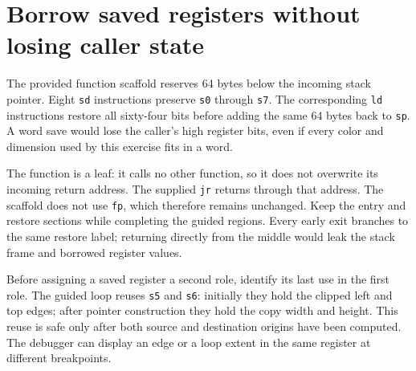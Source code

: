 \section{Borrow saved registers without losing caller state}\label{blit-calling}
The provided function scaffold reserves 64 bytes below the incoming stack pointer. Eight \texttt{sd} instructions preserve \texttt{s0} through \texttt{s7}. The corresponding \texttt{ld} instructions restore all sixty-four bits before adding the same 64 bytes back to \texttt{sp}. A word save would lose the caller's high register bits, even if every color and dimension used by this exercise fits in a word.

The function is a leaf: it calls no other function, so it does not overwrite its incoming return address. The supplied \texttt{jr} returns through that address. The scaffold does not use \texttt{fp}, which therefore remains unchanged. Keep the entry and restore sections while completing the guided regions. Every early exit branches to the same restore label; returning directly from the middle would leak the stack frame and borrowed register values.

Before assigning a saved register a second role, identify its last use in the first role. The guided loop reuses \texttt{s5} and \texttt{s6}: initially they hold the clipped left and top edges; after pointer construction they hold the copy width and height. This reuse is safe only after both source and destination origins have been computed. The debugger can display an edge or a loop extent in the same register at different breakpoints.
